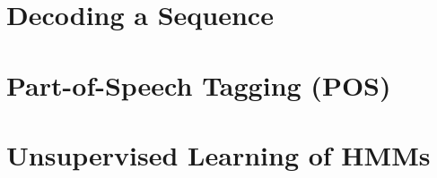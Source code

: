 \section{\label{decoding} Decoding a Sequence}


\section{\label{pos-tagging} Part-of-Speech Tagging (POS)}


\section{\label{unsupervised} Unsupervised Learning of HMMs}





%

%


